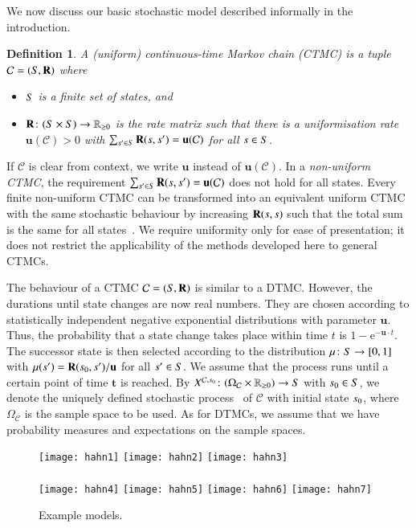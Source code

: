 \documentclass[10pt,twocolumn]{article}
\newtheorem{definition}{Definition}
\newcommand{\states} {{\ensuremath S}}
\newcommand{\state}  {{\ensuremath s}}
\newcommand{\distr}  {{\ensuremath {\mu}}}
\newcommand{\reals}  {{\ensuremath {\mathbb{R}}}}
\newcommand{\rmat}{\mathbf{R}}
\newcommand{\cmodel}{\mathcal{C}}
\newcommand{\urate}{\mathbf{u}}
\newcommand{\timeb}{\mathbf{t}}
\newcommand{\stopro}{X}
\newcommand{\samspace}[1]{\Omega_{#1}}
\begin{document}
We now discuss our basic stochastic model described informally in the introduction.
\begin{definition}
  \label{def:ctmc}
A \emph{(uniform) continuous-time Markov chain (CTMC)} is a tuple $\cmodel = (\states, \rmat)$ where 
\begin{itemize}
  \item $\states$ is a finite set of \emph{states}, and
  \item $\rmat\colon (\states \times \states) \to \reals_{\geq 0}$ is the
    \emph{rate matrix} such that there is a \emph{uniformisation rate} $\urate(\cmodel) > 0$
    with $\sum_{\state' \in \states}
    \rmat(\state, \state') = \urate(\cmodel)$ for all $\state \in \states$.
  \end{itemize}
\end{definition}
If $\cmodel$ is clear from context, we write $\urate$ instead of $\urate(\cmodel)$.
In a \emph{non-uniform CTMC}, the requirement $\sum_{\state' \in \states} \rmat(\state, \state') = \urate(\cmodel)$ does not hold for all states.
Every finite non-uniform CTMC can be transformed into an equivalent uniform CTMC with the same stochastic behaviour by increasing 
$\rmat(\state, \state)$ such that the total sum is the same for all states~\cite{Stewart94}.
We require uniformity only for ease of presentation; it does not restrict the applicability of the methods developed here to general CTMCs.

The behaviour of a CTMC $\cmodel = (\states, \rmat)$ is similar to a DTMC.
However, the durations until state changes are now real numbers.
They are chosen according to statistically independent negative exponential distributions with parameter $\urate$.
Thus, the probability that a state change takes place within time $t$ is $1 - \mathrm{e}^{-\urate\cdot t}$.
The successor state is then selected according to the distribution $\distr\colon \states \to [0,1]$ with $\distr(\state') = \rmat(\state_0,\state')/\urate$ for all $\state' \in \states$.
We assume that the process runs until a certain point of time $\timeb$ is reached.
By $\stopro^{\cmodel,\state_0}\colon (\samspace{\cmodel} \times \reals_{\geq 0}) \to \states$ with $\state_0 \in \states$,
we denote the uniquely defined stochastic process~\cite{Stewart94} of $\cmodel$ with initial state $\state_0$,
where $\samspace{\cmodel}$ is the sample space to be used.
As for DTMCs, we assume that we have probability measures and expectations on the sample spaces.
\begin{figure*}
\centering
\texttt{[image: hahn1]}
\hfill
\texttt{[image: hahn2]}
\hfill
\texttt{[image: hahn3]}
\ \\\ \\
\texttt{[image: hahn4]}
\hfill
\texttt{[image: hahn5]}
\hfill
\texttt{[image: hahn6]}
\hfill
\texttt{[image: hahn7]}
\caption{\label{fig:examples}Example models.}
\end{figure*}
\end{document}
